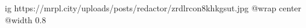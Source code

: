  
 
 
 
 

\ifcmt
  ig https://mrpl.city/uploads/posts/redactor/zrdlrcon8khkgsut.jpg
  @wrap center
  @width 0.8
\fi
